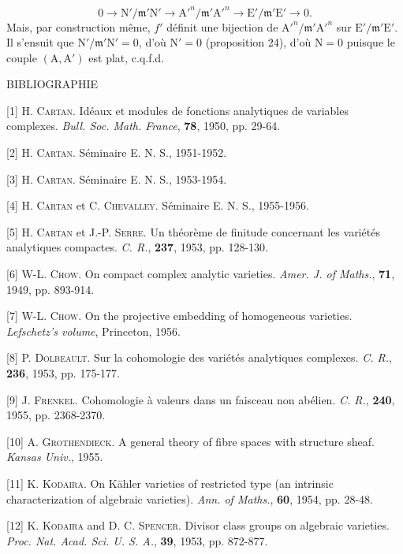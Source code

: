 \begin{equation*}
0 \longrightarrow \mathrm{N}'/\mathfrak{m}'\mathrm{N}' \longrightarrow \mathrm{A}'^n/\mathfrak{m}'\mathrm{A}'^n \longrightarrow \mathrm{E}'/\mathfrak{m}'\mathrm{E}' \longrightarrow 0.
\end{equation*}
Mais, par construction même, $f'$ définit une bijection de $\mathrm{A}'^n/\mathfrak{m}'\mathrm{A}'^n$ sur $\mathrm{E}'/\mathfrak{m}'\mathrm{E}'$. Il s'ensuit que $\mathrm{N}'/\mathfrak{m}'\mathrm{N}' = 0$, d'où $\mathrm{N}' = 0$ (proposition 24), d'où $\mathrm{N} = 0$ puisque le couple $(\mathrm{A}, \mathrm{A}')$ est plat, c.q.f.d.


\begin{center}BIBLIOGRAPHIE\end{center}

[1] H. \textsc{Cartan}. Idéaux et modules de fonctions analytiques de variables complexes. \textit{Bull. Soc. Math. France}, \textbf{78}, 1950, pp. 29-64.

[2] H. \textsc{Cartan}. Séminaire E. N. S., 1951-1952.

[3] H. \textsc{Cartan}. Séminaire E. N. S., 1953-1954.

[4] H. \textsc{Cartan} et C. \textsc{Chevalley}. Séminaire E. N. S., 1955-1956.

[5] H. \textsc{Cartan} et J.-P. \textsc{Serre}. Un théorème de finitude concernant les variétés analytiques compactes. \textit{C. R.}, \textbf{237}, 1953, pp. 128-130.

[6] W-L. \textsc{Chow}. On compact complex analytic varieties. \textit{Amer. J. of Maths.}, \textbf{71}, 1949, pp. 893-914.

[7] W-L. \textsc{Chow}. On the projective embedding of homogeneous varieties. \textit{Lefschetz's volume}, Princeton, 1956.

[8] P. \textsc{Dolbeault}. Sur la cohomologie des variétés analytiques complexes. \textit{C. R.}, \textbf{236}, 1953, pp. 175-177.

[9] J. \textsc{Frenkel}. Cohomologie à valeurs dans un faisceau non abélien. \textit{C. R.}, \textbf{240}, 1955, pp. 2368-2370.

[10] A. \textsc{Grothendieck}. A general theory of fibre spaces with structure sheaf. \textit{Kansas Univ.}, 1955.

[11] K. \textsc{Kodaira}. On Kähler varieties of restricted type (an intrinsic characterization of algebraic varieties). \textit{Ann. of Maths.}, \textbf{60}, 1954, pp. 28-48.

[12] K. \textsc{Kodaira} and D. C. \textsc{Spencer}. Divisor class groups on algebraic varieties. \textit{Proc. Nat. Acad. Sci. U. S. A.}, \textbf{39}, 1953, pp. 872-877.

